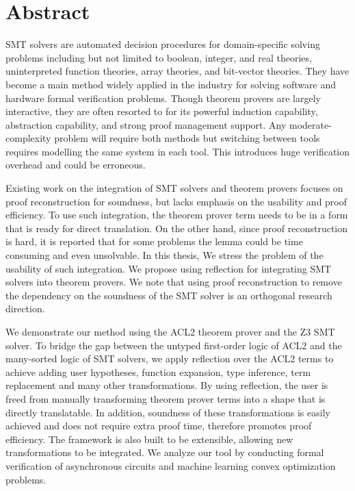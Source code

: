 
\chapter{Abstract}

SMT solvers are automated decision procedures for domain-specific solving
problems including but not limited to boolean, integer, and real theories,
uninterpreted function theories, array theories, and bit-vector theories.
They have become a main method widely applied in the industry for solving
software and hardware formal verification problems.
Though theorem provers are largely interactive, they are often resorted to for
its powerful induction capability, abstraction capability, and strong proof
management support.
Any moderate-complexity problem will require both methods but switching between
tools requires modelling the same system in each tool.
This introduces huge verification overhead and could be erroneous.

Existing work on the integration of SMT solvers and theorem provers focuses on
proof reconstruction for soundness, but lacks emphasis on the usability and
proof efficiency.
To use such integration, the theorem prover term needs to be in a form that is
ready for direct translation.
On the other hand, since proof reconstruction is hard, it is reported that for
some problems the lemma could be time consuming and even unsolvable.
In this thesis, We stress the problem of the usability of such integration.
We propose using reflection for integrating SMT solvers into theorem provers.
We note that using proof reconstruction to remove the dependency on the
soundness of the SMT solver is an orthogonal research direction.

We demonstrate our method using the ACL2 theorem prover and the Z3 SMT solver.
To bridge the gap between the untyped first-order logic of ACL2 and the
many-sorted logic of SMT solvers, we apply reflection over the ACL2 terms to
achieve adding user hypotheses, function expansion, type inference, term
replacement and many other transformations.
By using reflection, the user is freed from manually transforming theorem prover
terms into a shape that is directly translatable.
In addition, soundness of these transformations is easily achieved and does not
require extra proof time, therefore promotes proof efficiency.
The framework is also built to be extensible, allowing new transformations to be
integrated.
We analyze our tool by conducting formal verification of asynchronous circuits
and machine learning convex optimization problems.

